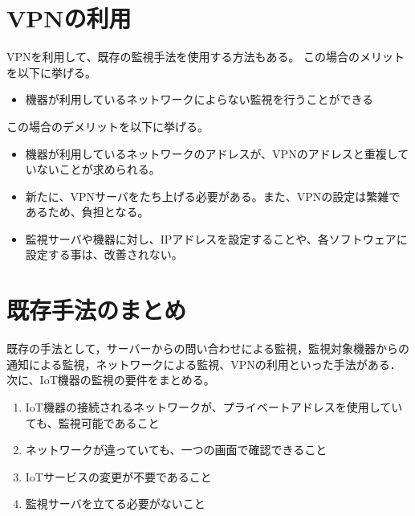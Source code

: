 \begin{comment}
	しかし，そのネットワークを利用している場合に限り機器の状況を推測できるので，異なるネットワークに接続された機器と，専用ネットワークを用いた機器とを１箇所で監視することが難しい．
\end{comment}

\section{VPNの利用}
	VPNを利用して、既存の監視手法を使用する方法もある。
	この場合のメリットを以下に挙げる。
	\begin{itemize}
		\item 機器が利用しているネットワークによらない監視を行うことができる
	\end{itemize}
	
	この場合のデメリットを以下に挙げる。
	\begin{itemize}
		\item 機器が利用しているネットワークのアドレスが、VPNのアドレスと重複していないことが求められる。
		\item 新たに、VPNサーバをたち上げる必要がある。また、VPNの設定は繁雑であるため、負担となる。
		\item 監視サーバや機器に対し、IPアドレスを設定することや、各ソフトウェアに設定する事は、改善されない。
	\end{itemize}

\begin{comment}
	しかし、この場合でも、VPNサーバを立ち上げなければならない、監視のためのサーバを立ち上げなければならない。
	またVPNクライアントが動く機器でないといけない。
	また、IoT機器が接続するネットワークのアドレスと、VPNのネットワークアドレスがかぶっていてはならない事が求められる。
	IoT機器が接続されるネットワークが様々であることを考えると、現実的ではない。
\end{comment}


\section{既存手法のまとめ}
	既存の手法として，サーバーからの問い合わせによる監視，監視対象機器からの通知による監視，ネットワークによる監視、VPNの利用といった手法がある．
	次に、IoT機器の監視の要件をまとめる。
	\begin{enumerate}
		\item IoT機器の接続されるネットワークが、プライベートアドレスを使用していても、監視可能であること
		\item ネットワークが違っていても、一つの画面で確認できること
		\item IoTサービスの変更が不要であること
		\item 監視サーバを立てる必要がないこと
	\end{enumerate}

